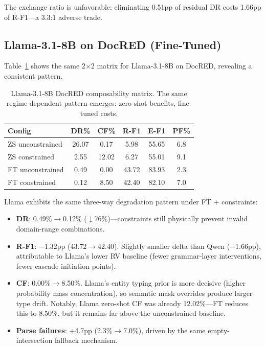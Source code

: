\documentclass[11pt,a4paper]{article}
\begin{document}
The exchange ratio is unfavorable: eliminating 0.51pp of residual DR costs 1.66pp of R-F1---a 3.3:1 adverse trade.

\subsection{Llama-3.1-8B on DocRED (Fine-Tuned)}

Table~\ref{tab:llama-docred-ft} shows the same 2$\times$2 matrix for Llama-3.1-8B on DocRED, revealing a consistent pattern.

\begin{table}[t]
\centering
\small
\begin{tabular}{lccccc}
\toprule
\textbf{Config} & \textbf{DR\%} & \textbf{CF\%} & \textbf{R-F1} & \textbf{E-F1} & \textbf{PF\%} \\
\midrule
ZS unconstrained & 26.07 & 0.17 & 5.98 & 55.65 & 6.8 \\
ZS constrained & 2.55 & 12.02 & 6.27 & 55.01 & 9.1 \\
\midrule
FT unconstrained & 0.49 & 0.00 & 43.72 & 83.93 & 2.3 \\
FT constrained & 0.12 & 8.50 & 42.40 & 82.10 & 7.0 \\
\bottomrule
\end{tabular}
\caption{Llama-3.1-8B DocRED composability matrix. The same regime-dependent pattern emerges: zero-shot benefits, fine-tuned costs.}
\label{tab:llama-docred-ft}
\end{table}

Llama exhibits the same three-way degradation pattern under FT + constraints:
\begin{itemize}
    \item \textbf{DR}: 0.49\%$\to$0.12\% ($\downarrow$76\%)---constraints still physically prevent invalid domain-range combinations.
    \item \textbf{R-F1}: $-$1.32pp (43.72$\to$42.40). Slightly smaller delta than Qwen ($-$1.66pp), attributable to Llama's lower RV baseline (fewer grammar-layer interventions, fewer cascade initiation points).
    \item \textbf{CF}: 0.00\%$\to$8.50\%. Llama's entity typing prior is more decisive (higher probability mass concentration), so semantic mask overrides produce larger type drift. Notably, Llama zero-shot CF was already 12.02\%---FT reduces this to 8.50\%, but it remains far above the unconstrained baseline.
    \item \textbf{Parse failures}: +4.7pp (2.3\%$\to$7.0\%), driven by the same empty-intersection fallback mechanism.
\end{itemize}
\end{document}
